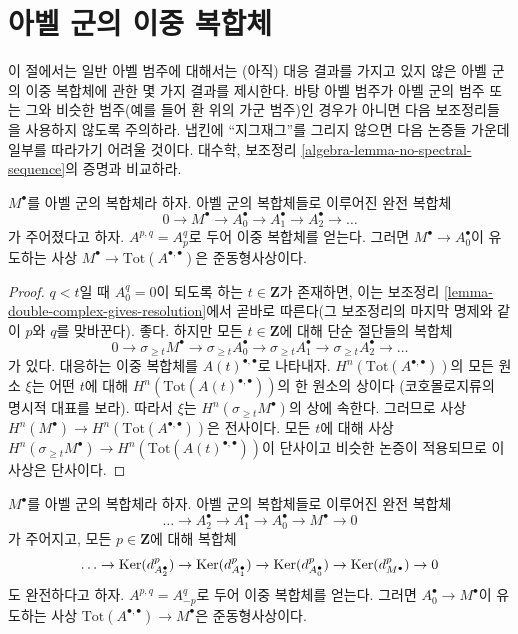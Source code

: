 \section{아벨 군의 이중 복합체}
\label{section-double-complexes-abelian-groups}

\noindent
이 절에서는 일반 아벨 범주에 대해서는 (아직) 대응 결과를 가지고 있지
않은 아벨 군의 이중 복합체에 관한 몇 가지 결과를 제시한다.
바탕 아벨 범주가 아벨 군의 범주 또는 그와 비슷한 범주(예를 들어 환
위의 가군 범주)인 경우가 아니면 다음 보조정리들을 사용하지 않도록
주의하라. 냅킨에 “지그재그”를 그리지 않으면 다음 논증들 가운데
일부를 따라가기 어려울 것이다. 대수학, 보조정리
\ref{algebra-lemma-no-spectral-sequence}의 증명과 비교하라.

\begin{lemma}
\label{lemma-right-resolution-gives-qis}
$M^\bullet$를 아벨 군의 복합체라 하자. 아벨 군의 복합체들로 이루어진
완전 복합체
$$
0 \to M^\bullet \to A_0^\bullet \to A_1^\bullet \to A_2^\bullet \to \ldots
$$
가 주어졌다고 하자. $A^{p, q} = A_p^q$로 두어 이중 복합체를 얻는다.
그러면 $M^\bullet \to A_0^\bullet$이 유도하는 사상
$M^\bullet \to \text{Tot}(A^{\bullet, \bullet})$은 준동형사상이다.
\end{lemma}

\begin{proof}
$q < t$일 때 $A_0^q = 0$이 되도록 하는 $t \in \mathbf{Z}$가 존재하면,
이는 보조정리 \ref{lemma-double-complex-gives-resolution}에서 곧바로
따른다(그 보조정리의 마지막 명제와 같이 $p$와 $q$를 맞바꾼다).
좋다. 하지만 모든 $t \in \mathbf{Z}$에 대해 단순 절단들의 복합체
$$
0 \to
\sigma_{\geq t}M^\bullet \to
\sigma_{\geq t}A_0^\bullet \to
\sigma_{\geq t}A_1^\bullet \to
\sigma_{\geq t}A_2^\bullet \to \ldots
$$
가 있다. 대응하는 이중 복합체를 $A(t)^{\bullet, \bullet}$로 나타내자.
$H^n(\text{Tot}(A^{\bullet, \bullet}))$의 모든 원소 $\xi$는 어떤 $t$에
대해 $H^n(\text{Tot}(A(t)^{\bullet, \bullet}))$의 한 원소의 상이다
(코호몰로지류의 명시적 대표를 보라). 따라서 $\xi$는
$H^n(\sigma_{\geq t}M^\bullet)$의 상에 속한다. 그러므로 사상
$H^n(M^\bullet) \to H^n(\text{Tot}(A^{\bullet, \bullet}))$은 전사이다.
모든 $t$에 대해 사상
$H^n(\sigma_{\geq t}M^\bullet) \to
H^n(\text{Tot}(A(t)^{\bullet, \bullet}))$이 단사이고 비슷한 논증이
적용되므로 이 사상은 단사이다.
\end{proof}

\begin{lemma}
\label{lemma-good-resolution-gives-qis}
$M^\bullet$를 아벨 군의 복합체라 하자. 아벨 군의 복합체들로 이루어진
완전 복합체
$$
\ldots \to A_2^\bullet \to A_1^\bullet \to A_0^\bullet \to M^\bullet \to 0
$$
가 주어지고, 모든 $p \in \mathbf{Z}$에 대해 복합체
$$
\ldots \to \mathop{\mathrm{Ker}}(d_{A_2^\bullet}^p) \to \mathop{\mathrm{Ker}}(d_{A_1^\bullet}^p)
\to \mathop{\mathrm{Ker}}(d_{A_0^\bullet}^p) \to \mathop{\mathrm{Ker}}(d_{M^\bullet}^p) \to 0
$$
도 완전하다고 하자. $A^{p, q} = A_{-p}^q$로 두어 이중 복합체를
얻는다. 그러면 $A_0^\bullet \to M^\bullet$이 유도하는 사상
$\text{Tot}(A^{\bullet, \bullet}) \to M^\bullet$은 준동형사상이다.
\end{lemma}


